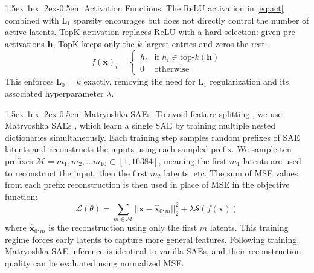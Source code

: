 \documentclass{article}
\makeatletter
\renewcommand{\paragraph}{%
  \@startsection{paragraph}{4}%
  {\z@}{1.5ex \@plus 1ex \@minus .2ex}{-0.5em}%
  {\normalfont\normalsize\bfseries}%
}
\theoremstyle{plain}
\theoremstyle{definition}
\theoremstyle{remark}
\makeatother
\begin{document}
\paragraph{Activation Functions.}
The ReLU activation in \cref{eq:act} combined with L$_1$ sparsity encourages but does not directly control the number of active latents.
TopK activation \citep{gao2025scaling} replaces ReLU with a hard selection: given pre-activations $\mathbf{h}$, TopK keeps only the $k$ largest entries and zeros the rest:
\begin{equation}\label{eq:topk}
    f(\mathbf{x})_i = \begin{cases} h_i & \text{if } h_i \in \text{top-}k(\mathbf{h}) \\ 0 & \text{otherwise} \end{cases}
\end{equation}
This enforces L$_0 = k$ exactly, removing the need for L$_1$ regularization and its associated hyperparameter $\lambda$.

\paragraph{Matryoshka SAEs.}
To avoid feature splitting \citep{bricken2023monosemanticity,chanin2024absorption,leask2025sparse}, we use Matryoshka SAEs \cite{bussmann2025matryoshka}, which learn a single SAE by training multiple nested dictionaries simultaneously.
Each training step samples random prefixes of SAE latents and reconstructs the inputs using each sampled prefix.
We sample ten prefixes $\mathcal{M} = m_1, m_2, ... m_{10} \subset [1, 16384]$, meaning the first $m_1$ latents are used to reconstruct the input, then the first $m_2$ latents, etc. The sum of MSE values from each prefix reconstruction is then used in place of MSE in the objective function:
\begin{equation}\label{eq:matryoshka-objective}
\mathcal{L}(\theta) = \sum_{m \in \mathcal{M}} ||\mathbf{x}-\mathbf{\hat{x}}_{0:m}||^2_2 + \lambda \mathcal{S}(f(\mathbf{x}))
\end{equation}
where $\mathbf{\hat{x}}_{0:m}$ is the reconstruction using only the first $m$ latents. This training regime forces early latents to capture more general features. 
Following training, Matryoshka SAE inference is identical to vanilla SAEs, and their reconstruction quality can be evaluated using normalized MSE. 
\end{document}
